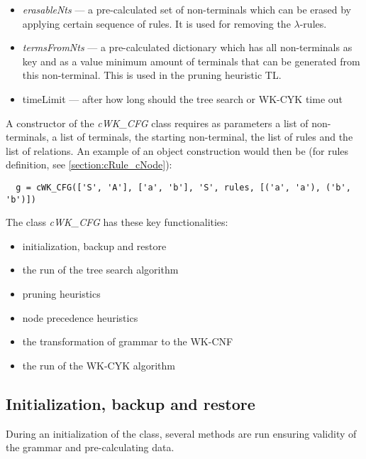 \begin{itemize}
  \item{\textit{erasableNts} --- a pre-calculated set of non-terminals which can be erased by applying certain sequence of rules. It is used for removing the $\lambda$-rules.}

  \item{\textit{termsFromNts} --- a pre-calculated dictionary which has all non-terminals as key and as a value minimum amount of terminals that can be generated from this non-terminal. This is used in the pruning heuristic TL.}

  \item{timeLimit --- after how long should the tree search or WK-CYK time out}
\end{itemize}

A constructor of the \textit{cWK\_CFG} class requires as parameters a list of non-terminals, a list of terminals, the starting non-terminal, the list of rules and the list of relations. An example of an object construction would then be (for rules definition, see \ref{section:cRule_cNode}):
\begin{verbatim}
  g = cWK_CFG(['S', 'A'], ['a', 'b'], 'S', rules, [('a', 'a'), ('b', 'b')])
\end{verbatim}

\bigskip
The class \textit{cWK\_CFG} has these key functionalities:
\begin{itemize}
  \item{initialization, backup and restore}
  \item{the run of the tree search algorithm}
  \item{pruning heuristics}
  \item{node precedence heuristics}
  \item{the transformation of grammar to the WK-CNF}
  \item{the run of the WK-CYK algorithm}
\end{itemize}

\subsection{Initialization, backup and restore}
During an initialization of the class, several methods are run ensuring validity of the grammar and pre-calculating data.

